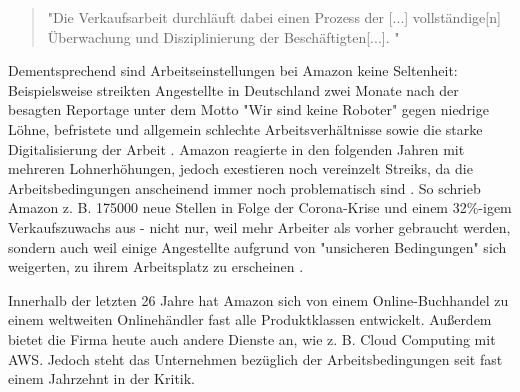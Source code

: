 \begin{quote}
    "Die Verkaufsarbeit durchläuft dabei einen Prozess der [...] vollständige[n] Überwachung und Disziplinierung der Beschäftigten[...]. \cite[S. 29]{Apicella}"
\end{quote}
Dementsprechend sind Arbeitseinstellungen bei Amazon keine Seltenheit: Beispielsweise streikten Angestellte in Deutschland zwei Monate nach der besagten Reportage unter dem Motto "Wir sind keine Roboter" gegen niedrige Löhne, befristete und allgemein schlechte Arbeitsverhältnisse sowie die starke Digitalisierung der Arbeit \cite[S. 6]{Apicella}. Amazon reagierte in den folgenden Jahren mit mehreren Lohnerhöhungen, jedoch exestieren noch vereinzelt Streiks, da die Arbeitsbedingungen anscheinend immer noch problematisch sind \cite{JGraf}. So schrieb Amazon z. B. 175000 neue Stellen in Folge der Corona-Krise und einem 32\%-igem Verkaufszuwachs aus - nicht nur, weil mehr Arbeiter als vorher gebraucht werden, sondern auch weil einige Angestellte aufgrund von "unsicheren Bedingungen" sich weigerten, zu ihrem Arbeitsplatz zu erscheinen \cite{Theweek}.

Innerhalb der letzten 26 Jahre hat Amazon sich von einem Online-Buchhandel zu einem weltweiten Onlinehändler fast alle Produktklassen entwickelt. Außerdem bietet die Firma heute auch andere Dienste an, wie z. B. Cloud Computing mit \ac{AWS}. Jedoch steht das Unternehmen bezüglich der Arbeitsbedingungen seit fast einem Jahrzehnt in der Kritik.
